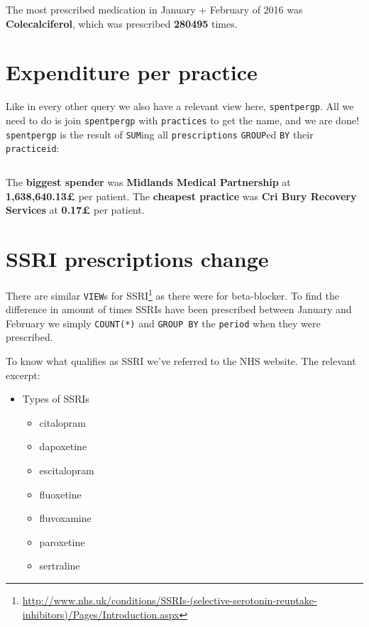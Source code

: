\documentclass[english,a4paper,]{report}
\renewcommand{\href}[2]{#2\footnote{\url{#1}}}
\providecommand{\tightlist}{%
  \setlength{\itemsep}{0pt}\setlength{\parskip}{0pt}}
\begin{document}
\inputminted[firstline=42,lastline=53]{sql}{src/sql/02-queries.sql}

The most prescribed medication in January + February of 2016 was
\textbf{Colecalciferol}, which was prescribed \textbf{280495} times.

\section{Expenditure per practice}\label{expenditure-per-practice}

Like in every other query we also have a relevant view here,
\texttt{spentpergp}. All we need to do is join \texttt{spentpergp} with
\texttt{practices} to get the name, and we are done! \texttt{spentpergp}
is the result of \texttt{SUM}ing all \texttt{prescriptions}
\texttt{GROUP}ed \texttt{BY} their \texttt{practiceid}:

\inputminted[firstline=55,lastline=80]{sql}{src/sql/02-queries.sql}

The \textbf{biggest spender} was \textbf{Midlands Medical Partnership}
at \textbf{1,638,640.13£} per patient. The \textbf{cheapest practice}
was \textbf{Cri Bury Recovery Services} at \textbf{0.17£} per patient.

\section{SSRI prescriptions change}\label{ssri-prescriptions-change}

There are similar \texttt{VIEW}s for
\href{http://www.nhs.uk/conditions/SSRIs-(selective-serotonin-reuptake-inhibitors)/Pages/Introduction.aspx}{SSRI}
as there were for beta-blocker. To find the difference in amount of
times SSRIs have been prescribed between January and February we simply
\texttt{COUNT(*)} and \texttt{GROUP\ BY} the \texttt{period} when they
were prescribed.

To know what qualifies as SSRI we've referred to the NHS website. The
relevant excerpt:

\begin{itemize}
\tightlist
\item
  Types of SSRIs

  \begin{itemize}
  \tightlist
  \item
    citalopram
  \item
    dapoxetine
  \item
    escitalopram
  \item
    fluoxetine
  \item
    fluvoxamine
  \item
    paroxetine
  \item
    sertraline
  \end{itemize}
\end{itemize}
\end{document}
